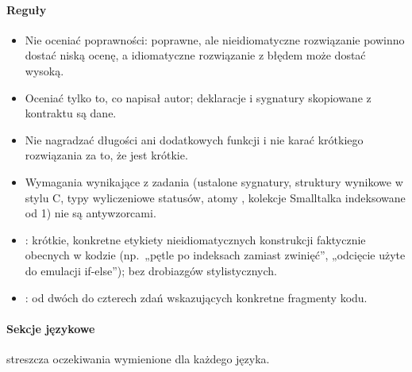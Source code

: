 \paragraph{Reguły}
\begin{itemize}
  \item Nie oceniać poprawności: poprawne, ale nieidiomatyczne rozwiązanie powinno dostać niską
    ocenę, a idiomatyczne rozwiązanie z błędem może dostać wysoką.
  \item Oceniać tylko to, co napisał autor; deklaracje i sygnatury skopiowane z kontraktu są dane.
  \item Nie nagradzać długości ani dodatkowych funkcji i nie karać krótkiego rozwiązania za to, że
    jest krótkie.
  \item Wymagania wynikające z zadania (ustalone sygnatury, struktury wynikowe w stylu C, typy
    wyliczeniowe statusów, atomy , kolekcje Smalltalka indeksowane od 1) nie są
    antywzorcami.
  \item {}: krótkie, konkretne etykiety nieidiomatycznych konstrukcji faktycznie
    obecnych w kodzie (np.\ „pętle po indeksach zamiast zwinięć”, „odcięcie użyte do emulacji
    if-else”); bez drobiazgów stylistycznych.
  \item {}: od dwóch do czterech zdań wskazujących konkretne fragmenty kodu.
\end{itemize}

\paragraph{Sekcje językowe}  streszcza oczekiwania wymienione dla każdego
języka.

